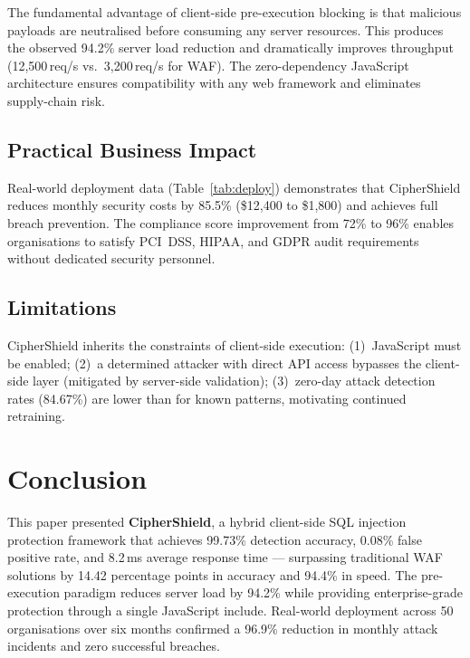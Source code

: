 \documentclass[10pt, twocolumn]{article}
\begin{document}
The fundamental advantage of client-side pre-execution blocking is that 
malicious payloads are neutralised before consuming any server resources. 
This produces the observed 94.2\% server load reduction and dramatically 
improves throughput (12,500\,req/s vs.\ 3,200\,req/s for WAF). 
The zero-dependency JavaScript architecture ensures compatibility with any 
web framework and eliminates supply-chain risk.

\subsection{Practical Business Impact}

Real-world deployment data (Table~\ref{tab:deploy}) demonstrates that 
CipherShield reduces monthly security costs by 85.5\% (\$12,400 to 
\$1,800) and achieves full breach prevention. The compliance score 
improvement from 72\% to 96\% enables organisations to satisfy PCI~DSS, 
HIPAA, and GDPR audit requirements without dedicated security personnel.

\subsection{Limitations}

CipherShield inherits the constraints of client-side execution: 
(1)~JavaScript must be enabled; (2)~a determined attacker with 
direct API access bypasses the client-side layer (mitigated by 
server-side validation); (3)~zero-day attack detection rates (84.67\%) 
are lower than for known patterns, motivating continued retraining.

\section{Conclusion}
\label{sec:conclusion}

This paper presented \textbf{CipherShield}, a hybrid client-side SQL injection 
protection framework that achieves 99.73\% detection accuracy, 0.08\% false 
positive rate, and 8.2\,ms average response time --- surpassing traditional 
WAF solutions by 14.42 percentage points in accuracy and 94.4\% in speed. 
The pre-execution paradigm reduces server load by 94.2\% while providing 
enterprise-grade protection through a single JavaScript include. Real-world 
deployment across 50 organisations over six months confirmed a 96.9\% 
reduction in monthly attack incidents and zero successful breaches.
\end{document}
